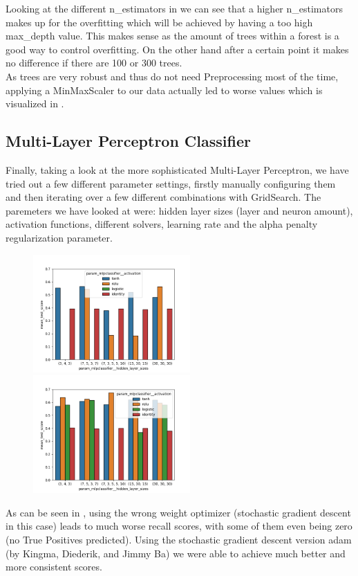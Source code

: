 Looking at the different n\_estimators in  we can see that a higher n\_estimators makes up for the overfitting which will be achieved by having a too high max\_depth value. This makes sense as the amount of trees within a forest is a good way to control overfitting. On the other hand after a certain point it makes no difference if there are 100 or 300 trees. \\
\newline
As trees are very robust and thus do not need Preprocessing most of the time, applying a MinMaxScaler to our data actually led to worse values which is visualized in .

\subsection{Multi-Layer Perceptron Classifier}
Finally, taking a look at the more sophisticated Multi-Layer Perceptron, we have tried out a few different parameter settings, firstly manually configuring them and then iterating over a few different combinations with GridSearch. The paremeters we have looked at were: hidden layer sizes (layer and neuron amount), activation functions, different solvers, learning rate and the alpha penalty regularization parameter.


\begin{figure}
\begin{floatrow}
    {\includegraphics[width=6cm]{onlineshop/plots/mlp_solver_comparisonsgd.png}\label{fig:mlp_sgd}}
    {\includegraphics[width=6cm]{onlineshop/plots/mlp_solver_comparisonadam.png}\label{fig:mlp_adam}}
\end{floatrow}
\end{figure}
As can be seen in , using the wrong weight optimizer (stochastic gradient descent in this case) leads to much worse recall scores, with some of them even being zero (no True Positives predicted). Using the stochastic gradient descent version adam (by Kingma, Diederik, and Jimmy Ba) we were able to achieve much better and more consistent scores.

